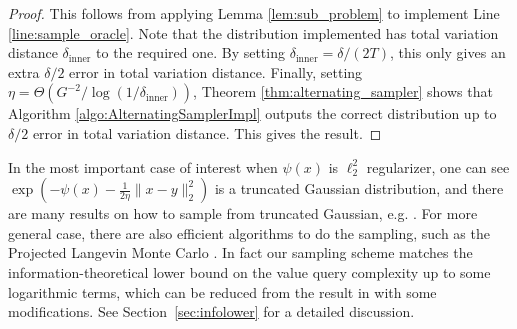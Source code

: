 \begin{proof}
This follows from applying Lemma \ref{lem:sub_problem} to implement
Line \ref{line:sample_oracle}. Note that the distribution implemented
has total variation distance $\delta_{\mathrm{inner}}$ to the required
one. By setting $\delta_{\mathrm{inner}}=\delta/(2T)$, this only
gives an extra $\delta/2$ error in total variation distance. Finally,
setting $\eta=\Theta(G^{-2}/\log(1/\delta_{\mathrm{inner}}))$, Theorem
\ref{thm:alternating_sampler} shows that Algorithm \ref{algo:AlternatingSamplerImpl}
outputs the correct distribution up to $\delta/2$ error in total
variation distance. This gives the result.
\end{proof}

In the most important case of interest when $\psi(x)$ is $\ell_2^2$ regularizer, one can see $\exp(-\psi(x) - \frac{1}{2\eta} \|x-y\|^2_2)$ is a truncated Gaussian distribution, and there are many results on how to sample from truncated Gaussian, e.g. \cite{KD99}.
For more general case, there are also efficient algorithms to do the sampling, such as the Projected Langevin Monte Carlo \cite{BEL18}.
In fact our sampling scheme matches the information-theoretical lower bound on the value query complexity up to some logarithmic terms, which can be reduced from the result in \cite{DJWW15} with some modifications.
See Section~\ref{sec:infolower} for a detailed discussion.